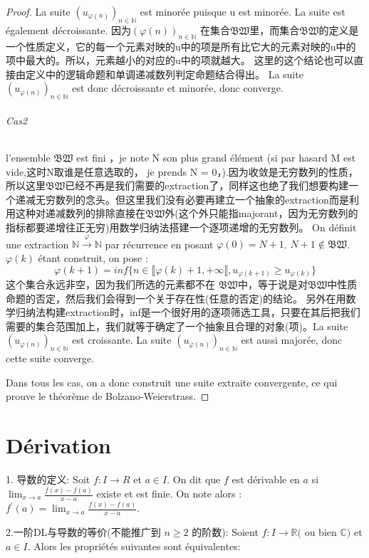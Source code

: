 \documentclass[12pt]{book}
\theoremstyle{definition}\newtheorem{dfn}{Définition}[chapter]
\theoremstyle{plain}\newtheorem{thm}{Théorème}[chapter]
\theoremstyle{plain}\newtheorem{prp}{Proposition}[chapter]
\theoremstyle{plain}\newtheorem{lem}{\bf Lemme}[chapter]
\theoremstyle{plain}\newtheorem{axm}{\bf Axiome}[chapter]
\theoremstyle{plain}\newtheorem{lmm}{\bf Lemme}[chapter]
\theoremstyle{plain}\newtheorem{cor}{\bf Corollaire}[chapter]
\theoremstyle{remark}\newtheorem{rem}{Remarque}[chapter]
\begin{document}
\begin{proof}
La suite $(u_{\varphi(n)})_{n\in \mathbb{N}}$ est minorée puisque u est minorée. La suite est également décroissante. 因为$(\varphi(n))_{n\in \mathbb{N}}$
在集合$\mathfrak{BW}$里，而集合$\mathfrak{BW}$的定义是一个性质定义，它的每一个元素对映的u中的项是所有比它大的元素对映的u中的项中最大的。所以，元素越小的对应的u中的项就越大。
这里的这个结论也可以直接由定义中的逻辑命题和单调递减数列判定命题结合得出。
La suite $(u_{\varphi(n)})_{n\in \mathbb{N}}$ est donc décroissante et minorée, donc converge.
\subparagraph{Cas2}
l’ensemble $\mathfrak{BW}$ est fini ，je note N son plus grand élément (si par hasard M est vide,这时N取谁是任意选取的， je prends N = 0，).因为收敛是无穷数列的性质，所以这里$\mathfrak{BW}$已经不再是我们需要的extraction了，同样这也绝了我们想要构建一个递减无穷数列的念头。但这里我们没有必要再建立一个抽象的extraction而是利用这种对递减数列的排除直接在$\mathfrak{BW}$外(这个外只能指majorant，因为无穷数列的指标都要递增往正无穷)用数学归纳法搭建一个逐项递增的无穷数列。 On définit une extraction
$\mathbb{N}\xrightarrow{\varphi} \mathbb{N}$ par récurrence en posant $\varphi(0)=N+1$. $N + 1 \notin \mathfrak{BW}$.
$\varphi(k)$ étant construit, on pose :
\begin{equation*}
\varphi(k+1)=inf\{n \in \llbracket \varphi(k)+1 , + \infty \llbracket
 ,u_{\varphi(k+1)} \ge u_{\varphi(k)} \}
\end{equation*}
这个集合永远非空，因为我们所选的元素都不在
$\mathfrak{BW}$中，等于说是对$\mathfrak{BW}$中性质命题的否定，然后我们会得到一个关于存在性(任意的否定)的结论。
另外在用数学归纳法构建extraction时，inf是一个很好用的逐项筛选工具，只要在其后把我们需要的集合范围加上，我们就等于确定了一个抽象且合理的对象(项)。La suite  $(u_{\varphi(n)})_{n\in \mathbb{N}}$  est croissante. La suite $(u_{\varphi(n)})_{n\in \mathbb{N}}$ est aussi majorée, donc cette suite converge.

Dans tous les cas, on a donc construit une suite extraite convergente, ce qui prouve le théorème de Bolzano-Weierstrass.
\end{proof}
\chapter{Dérivation}
1. 导数的定义: Soit $f: I \longrightarrow R$ et $a \in I .$ On dit que $f$ est dérivable en $a$ si $\lim _{x \rightarrow a} \frac{f(x)-f(a)}{x-a}$ existe et est finie. On note alors : $f^{\prime}(a)=\lim _{x \rightarrow a} \frac{f(x)-f(a)}{x-a}$.

2.一阶DL与导数的等价(不能推广到 $n \geq 2$ 的阶数):
Soient $f: I \longrightarrow \mathbb{R}($ ou bien $\mathbb{C})$ et $a \in I .$ Alors les propriétés suivantes sont équivalentes:
\end{document}
